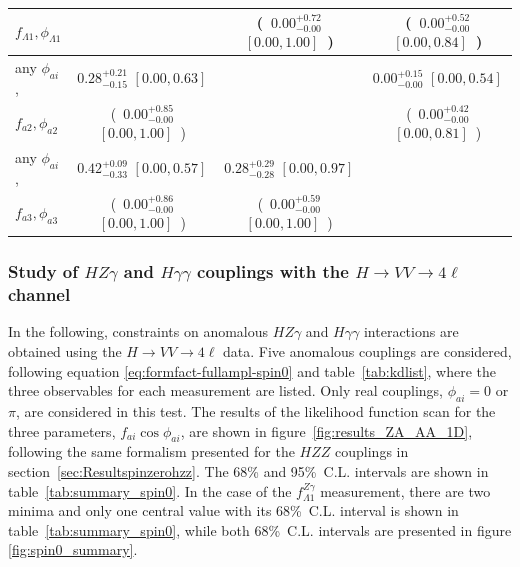 \begin{table}
\begin{tabular}{lccc}
$f_{\Lambda1},\phi_{\Lambda1}$&   ~~~~  &   (~$0.00^{+0.72}_{-0.00}$ $[0.00,1.00]$~) &(~$0.00^{+0.52}_{-0.00}$ $[0.00,0.84]$~)  \\ \hline
any $\phi_{ai}$,
 &  $0.28^{+0.21}_{-0.15}$ $[0.00,0.63]$ &    ~~~~ &   $0.00^{+0.15}_{-0.00}$ $[0.00,0.54]$  \\
$f_{a2},\phi_{a2}$&   (~$0.00^{+0.85}_{-0.00}$ $[0.00,1.00]$~) &   ~~~~ & (~$0.00^{+0.42}_{-0.00}$ $[0.00,0.81]$~)  \\ \hline
any $\phi_{ai}$,
&  $0.42^{+0.09}_{-0.33}$ $[0.00,0.57]$ &   $0.28^{+0.29}_{-0.28}$ $[0.00,0.97]$ &    ~~~~  \\
$f_{a3},\phi_{a3}$&   (~$0.00^{+0.86}_{-0.00}$ $[0.00,1.00]$~) &   (~$0.00^{+0.59}_{-0.00}$ $[0.00,1.00]$~) & ~~~~  \\
\end{tabular}
\label{tab:Spin0_ZZ_1D_KDb}
\end{table}


\subsubsection{Study of $HZ\gamma$ and $H\gamma\gamma$ couplings with the $H\to VV\to4\ell$ channel}  \label{sec:Resultspinzerohzg}

In the following, constraints on anomalous $HZ\gamma$ and $H\gamma\gamma$ interactions
are obtained using the $H\to VV\to 4\ell$ data. Five anomalous couplings are considered,
following equation \eqref{eq:formfact-fullampl-spin0} and table~\ref{tab:kdlist}, where the three
observables for each measurement are listed. Only real couplings, $\phi_{ai}=0$ or $\pi$,
are considered in this test. The results of the likelihood function scan for the three parameters,
$f_{ai}\cos\phi_{ai}$, are shown in figure~\ref{fig:results_ZA_AA_1D}, following the same
formalism presented for the $HZZ$ couplings in section~\ref{sec:Resultspinzerohzz}.
The 68\% and 95\%~C.L. intervals are shown in table~\ref{tab:summary_spin0}.
In the case of the $f_{\Lambda1}^{Z\gamma}$ measurement, there are two minima and only
one central value with its 68\%~C.L. interval is shown in table~\ref{tab:summary_spin0},
while both 68\%~C.L. intervals are presented in figure \ref{fig:spin0_summary}.

